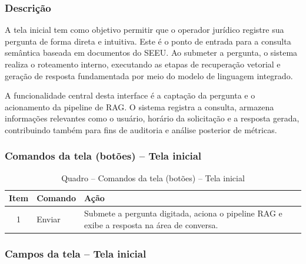 \begin{description}
\subsubsection{Descrição}

A tela inicial tem como objetivo permitir que o operador jurídico registre sua pergunta de forma direta e intuitiva. Este é o ponto de entrada para a consulta semântica baseada em documentos do SEEU. Ao submeter a pergunta, o sistema realiza o roteamento interno, executando as etapas de recuperação vetorial e geração de resposta fundamentada por meio do modelo de linguagem integrado.

A funcionalidade central desta interface é a captação da pergunta e o acionamento da pipeline de RAG. O sistema registra a consulta, armazena informações relevantes como o usuário, horário da solicitação e a resposta gerada, contribuindo também para fins de auditoria e análise posterior de métricas.

\subsubsection{Comandos da tela (botões) – Tela inicial}

\begin{table}[H]
  \centering
  \caption{Quadro – Comandos da tela (botões) – Tela inicial}
  \label{tab:cmd_tela_inicial}
  \begin{tabular}{|c|p{4cm}|p{8cm}|}
    \hline
    \textbf{Item} & \textbf{Comando} & \textbf{Ação} \\ \hline
    1 & Enviar & Submete a pergunta digitada, aciona o pipeline RAG e exibe a resposta na área de conversa. \\ \hline
  \end{tabular}
\end{table}


\subsubsection{Campos da tela – Tela inicial}


\begin{table}[H]
  \centering
  \caption{Quadro 1 – Campos da tela – Tela Inicial}
  \label{tab:campos_tela_inicial}
  \vspace{0.2cm}
\end{table}


\end{description}
